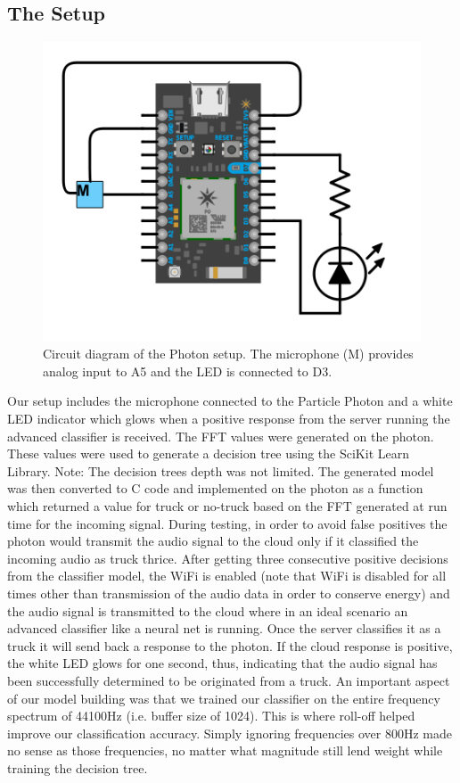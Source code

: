\documentclass[sigconf, authorversion=false,  screen=true]{acmart}
\begin{document}
	\subsection{The Setup}
	\begin{figure}
		\includegraphics[width=\linewidth]{photon}
		\caption{Circuit diagram of the Photon setup. The microphone (M) provides analog input to A5 and the LED is connected to D3.}
		\label{fig:photon}
	\end{figure}

	Our setup includes the microphone connected to the Particle Photon and a white LED indicator which glows when a positive response from the server running the advanced classifier is received. The FFT values were generated on the photon. These values were used to generate a decision tree using the SciKit Learn Library. Note: The decision trees depth was not limited. The generated model was then converted to C code and implemented on the photon as a function which returned a value for truck or no-truck based on the FFT generated at run time for the incoming signal. 
	During testing, in order to avoid false positives the photon would transmit the audio signal to the cloud only if it classified the incoming audio as truck thrice. After getting three consecutive positive decisions from the classifier model, the WiFi is enabled (note that WiFi is disabled for all times other than transmission of the audio data in order to conserve energy) and the audio signal is transmitted to the cloud where in an ideal scenario an advanced classifier like a neural net is running. Once the server classifies it as a truck it will send back a response to the photon. If the cloud response is positive, the white LED glows for one second, thus, indicating that the audio signal has been successfully determined to be originated from a truck.
	An important aspect of our model building was that we trained our classifier on the entire frequency spectrum of 44100Hz (i.e. buffer size of 1024). This is where roll-off helped improve our classification accuracy. Simply ignoring frequencies over 800Hz made no sense as those frequencies, no matter what magnitude still lend weight while training the decision tree.	
	
\end{document}
